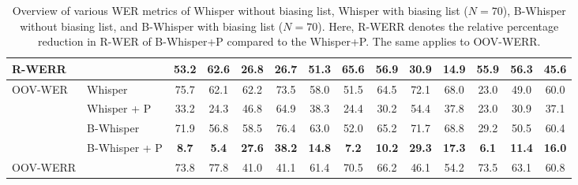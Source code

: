 \begin{table*}[t]
\begin{center}
\begin{tabular}{l|l|cc|ccccccccc|c}
\midrule
R-WERR &  & 53.2 & 62.6 & 26.8 & 26.7 & 51.3 & 65.6 & 56.9 & 30.9 & 14.9 & 55.9 & 56.3 & \color{darkgreen}45.6 \\

\midrule

\multirow{3}{*}{OOV-WER} & Whisper & 75.7 & 62.1 & 62.2 & 73.5 & 58.0 & 51.5 & 64.5 & 72.1 & 68.0 & 23.0 & 49.0 & 60.0 \\

& Whisper + P & 33.2 & 24.3 & 46.8 & 64.9 & 38.3 & 24.4 & 30.2 & 54.4 & 37.8 & 23.0 & 30.9 & 37.1\\
& B-Whisper & 71.9 & 56.8 & 58.5 & 76.4 & 63.0 & 52.0 & 65.2 & 71.7 & 68.8 & 29.2 & 50.5 & 60.4 \\
& B-Whisper + P & \textbf{8.7} & \textbf{5.4} & \textbf{27.6} & \textbf{38.2} & \textbf{14.8} & \textbf{7.2} & \textbf{10.2} & \textbf{29.3} & \textbf{17.3} & \textbf{6.1} & \textbf{11.4} & \textbf{16.0}\\

\midrule
OOV-WERR &  & 73.8 & 77.8 & 41.0 & 41.1 & 61.4 & 70.5 & 66.2 & 46.1 & 54.2 & 73.5 & 63.1 & \color{darkgreen}60.8 \\

\bottomrule

\end{tabular}
\caption{Overview of various WER metrics of Whisper without biasing list, Whisper with biasing list ($N = 70$), B-Whisper without biasing list, and B-Whisper with biasing list ($N = 70$). Here, R-WERR denotes the relative percentage reduction in R-WER of B-Whisper+P compared to the Whisper+P. The same applies to OOV-WERR.}
\label{robustness_table}
\end{center}
\vspace{-1em}
\end{table*}

